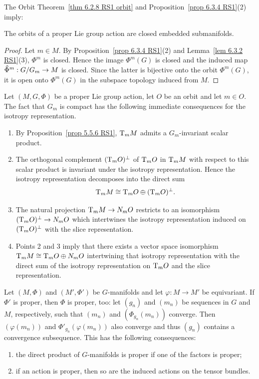 The Orbit Theorem~\ref{thm 6.2.8 RS1 orbit} and Proposition~\ref{prop 6.3.4 RS1}(2) imply:

\begin{cor}
    The orbits of a proper Lie group action are closed embedded submanifolds.
\end{cor}
\begin{proof}
    Let $m\in M$. By Proposition~\ref{prop 6.3.4 RS1}(2) and Lemma~\ref{lem 6.3.2 RS1}(3), $\Phi^m$ is closed. Hence the image $\Phi^m(G)$ is closed and the induced map  $\wh{\Phi}^m:G\slash G_m\to M$ is closed. Since the latter is bijective onto the orbit $\Phi^m(G)$, it is open onto $\Phi^m(G)$ in the subspace topology induced from $M$.
\end{proof}

\begin{rem}\label{rem 6.3.6 RS1}
    Let $(M,G,\Phi)$ be a proper Lie group action, let $O$ be an orbit and let $m\in O$. The fact that $G_m$ is compact has the following immediate consequences for the isotropy representation.
    \begin{enumerate}
        \item By Proposition~\ref{prop 5.5.6 RS1}, $\mathrm{T}_mM$ admits a $G_m$-invariant scalar product.
        \item The orthogonal complement $(\mathrm{T}_mO)^\perp$ of $\mathrm{T}_mO$  in $\mathrm{T}_mM$ with respect to this scalar product is invariant under the isotropy representation. Hence the isotropy representation decomposes into the direct sum
        \[\mathrm{T}_mM\cong \mathrm{T}_mO\oplus (\mathrm{T}_mO)^\perp.\]
        \item The natural projection $\mathrm{T}_mM\to N_mO$ restricts to an isomorphism $(\mathrm{T}_mO)^\perp\to N_mO$ which intertwines the isotropy representation induced on $(\mathrm{T}_mO)^\perp$ with the slice representation.
        \item Points 2 and 3 imply that there exists a vector space isomorphism $\mathrm{T}_mM\cong \mathrm{T}_mO\oplus N_mO$ intertwining that isotropy representation with the direct sum of the isotropy representation on $\mathrm{T}_mO$ and the slice representation.
    \end{enumerate}
\end{rem}

\begin{rem}\label{rem 6.3.9 RS1}
    Let $(M,\Phi)$ and $(M',\Phi')$ be $G$-manifolds and let $\varphi:M\to M'$ be equivariant. If $\Phi'$ is proper, then $\Phi$ is proper, too: let $(g_n)$ and $(m_n)$ be sequences in $G$ and $M$, respectively, such that $(m_n)$ and $(\Phi_{g_n}(m_n))$ converge. Then $(\varphi(m_n))$ and $\Phi'_{g_n}(\varphi(m_n))$ also converge and thus $(g_n)$ contains a convergence subsequence. This has the following consequences:
    \begin{enumerate}
        \item the direct product of $G$-manifolds is proper if one of the factors is proper;
        \item if an action is proper, then so are the induced actions on the tensor bundles.
    \end{enumerate}
\end{rem}

